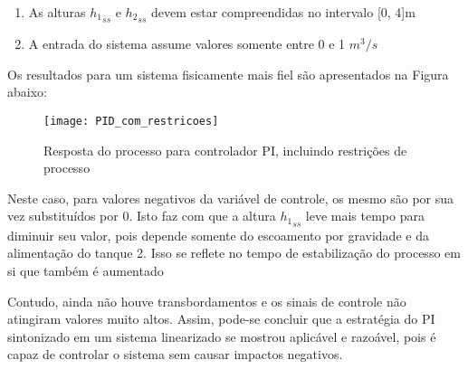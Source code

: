 \begin{enumerate}
	\item As alturas ${h_1}_{ss}$ e ${h_2}_{ss}$ devem estar compreendidas no intervalo [0, 4]m
	\item A entrada do sistema assume valores somente entre 0 e 1 $m^3/s$
\end{enumerate}

Os resultados para um sistema fisicamente mais fiel são apresentados na Figura abaixo:

\begin{figure}[H]
	\centering
	\texttt{[image: PID\_com\_restricoes]}
	\caption{Resposta do processo para controlador PI, incluindo restrições de processo}
	\label{img_pid_com_restricoes}
\end{figure}

Neste caso, para valores negativos da variável de controle, os mesmo são por sua vez substituídos por 0. Isto faz com que a altura ${h_1}_{ss}$ leve mais tempo para diminuir seu valor, pois depende somente do escoamento por gravidade e da alimentação do tanque 2. Isso se reflete no tempo de estabilização do processo em si que também é aumentado

Contudo, ainda não houve transbordamentos e os sinais de controle não atingiram valores muito altos. Assim, pode-se concluir que a estratégia do PI sintonizado em um sistema linearizado se mostrou aplicável e razoável, pois é capaz de controlar o sistema sem causar impactos negativos.

